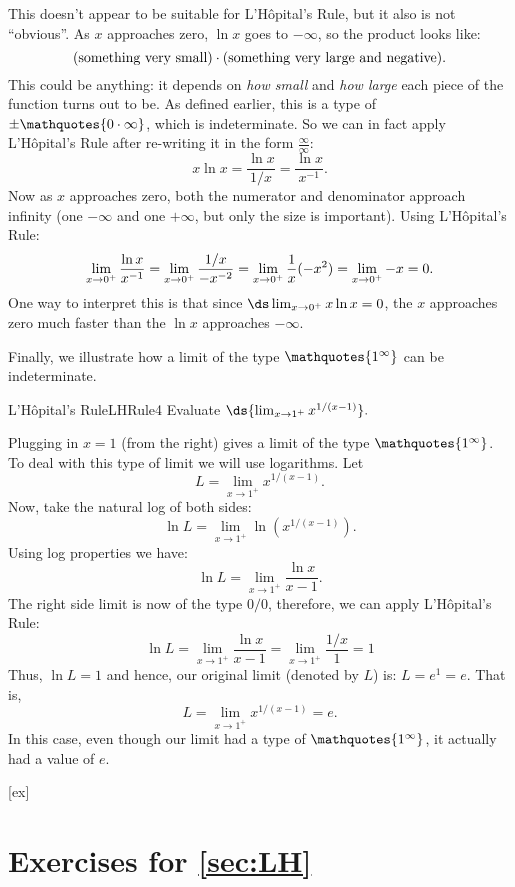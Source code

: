 \begin{solution} 
This doesn't appear to be suitable for L'H\^opital's Rule, but it also
is not ``obvious''. As $x$ approaches zero, $\ln x$ goes to $-\infty$,
so the product looks like:
$$(\hbox{something very small})\cdot(\hbox{something very large and negative}).$$
This could be anything: it depends on {\it how small} and
{\it how large} each piece of the function turns out to be. 
As defined earlier, this is a type of $\pm\mathquotes{0\cdot\infty}$, which is
indeterminate. So we can in fact apply L'H\^opital's Rule after re-writing
it in the form $\frac{\infty }{\infty }$:
$$x\ln x = \frac{\ln x}{1/x}=\frac{\ln x}{x^{-1}}.$$
Now as $x$ approaches zero, both the numerator and denominator
approach infinity (one $-\infty$ and one $+\infty$, but only the size
is important). Using  L'H\^opital's Rule:
$$\lim_{x\to 0^+} {\ln x\over x^{-1}}=
\lim_{x\to 0^+} {1/x\over -x^{-2}} =\lim_{x\to 0^+} {1\over x}(-x^2)=
\lim_{x\to 0^+} -x = 0.$$
One way to interpret this is that since $\ds\lim_{x\to
  0^+}x\ln x = 0$, the $x$ approaches zero much faster than the $\ln x$
approaches $-\infty$.
\end{solution}

Finally, we illustrate how a limit of the type $\mathquotes{1^\infty}$ can be indeterminate.

\begin{example} {L'H\^opital's Rule}{LHRule4}
Evaluate $\ds{\lim_{x\to 1^+}x^{1/(x-1)}}.$
\end{example}

\begin{solution} 
Plugging in $x=1$ (from the right) gives a limit of the type $\mathquotes{1^\infty}$.
To deal with this type of limit we will use logarithms.
Let
$$L=\lim_{x\to 1^+}x^{1/(x-1)}.$$
Now, take the natural log of both sides:
$$\ln L=\lim_{x\to 1^+}\ln\left(x^{1/(x-1)}\right).$$
Using log properties we have:
$$\ln L=\lim_{x\to 1^+}\frac{\ln x}{x-1}.$$
The right side limit is now of the type $0/0$, therefore, we can apply L'H\^opital's Rule:
$$\ln L=\lim_{x\to 1^+}\frac{\ln x}{x-1}=\lim_{x\to 1^+}\frac{1/x}{1}=1$$
Thus, $\ln L=1$ and hence, our original limit (denoted by $L$) is: $L=e^1=e$. That is,
$$L=\lim_{x\to 1^+}x^{1/(x-1)}=e.$$
In this case, even though our limit had a type of $\mathquotes{1^\infty}$, it actually had a value of $e$.
\end{solution}

[ex]
\section*{Exercises for \ref{sec:LH}}

